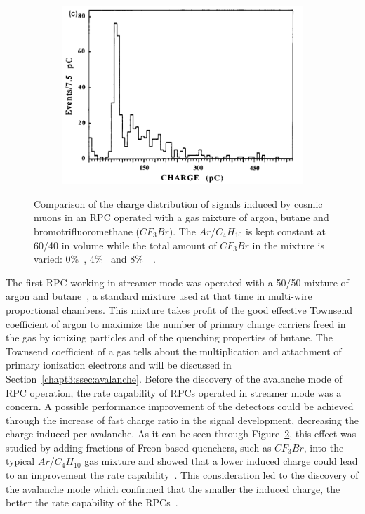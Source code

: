 \begin{figure}
\begin{subfigure}{\linewidth}
			\includegraphics[width = 0.5\plotwidth]{fig/chapt3/Gas-mix-8-freon.png}\\
			\caption{\label{fig:FreonCharge:C}}
		\end{subfigure}
		\caption{\label{fig:FreonCharge} Comparison of the charge distribution of signals induced by cosmic muons in an RPC operated with a gas mixture of argon, butane and bromotrifluoromethane ($CF_3Br$). The $Ar$/$C_4H_{10}$ is kept constant at 60/40 in volume while the total amount of $CF_3Br$ in the mixture is varied: 0\%~, 4\%~ and 8\%~~\cite{CARDARELLI93}.}
	\end{figure}
	
	The first RPC working in streamer mode was operated with a 50/50 mixture of argon and butane~\cite{SANTONICO81}, a standard mixture used at that time in multi-wire proportional chambers. This mixture takes profit of the good effective Townsend coefficient of argon to maximize the number of primary charge carriers freed in the gas by ionizing particles and of the quenching properties of butane. The Townsend coefficient of a gas tells about the multiplication and attachment of primary ionization electrons and will be discussed in Section~\ref{chapt3:ssec:avalanche}. Before the discovery of the avalanche mode of RPC operation, the rate capability of RPCs operated in streamer mode was a concern. A possible performance improvement of the detectors could be achieved through the increase of fast charge ratio in the signal development, decreasing the charge induced per avalanche. As it can be seen through Figure~\ref{fig:FreonCharge}, this effect was studied by adding fractions of Freon-based quenchers, such as $CF_3Br$, into the typical $Ar$/$C_4H_{10}$ gas mixture and showed that a lower induced charge could lead to an improvement the rate capability~\cite{CARDARELLI93}. This consideration led to the discovery of the avalanche mode which confirmed that the smaller the induced charge, the better the rate capability of the RPCs~\cite{CROTTY93}.
	
